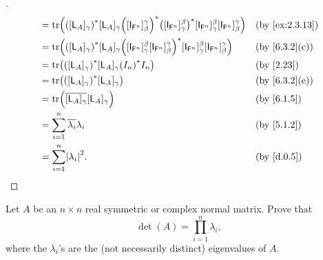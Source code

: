 \begin{proof}[]
\begin{align*}
               & = \tr[\pa{[\L_A]_{\gamma}}^* [\L_A]_{\gamma} \pa{[\IT[\vs{F}^n]]_{\beta}^{\gamma}}^* \pa{[\IT[\vs{F}^n]]_{\gamma}^{\beta}}^* [\IT[\vs{F}^n]]_{\gamma}^{\beta} [\IT[\vs{F}^n]]_{\beta}^{\gamma}] &  & \by{ex:2.3.13} \\
               & = \tr[\pa{[\L_A]_{\gamma}}^* [\L_A]_{\gamma} \pa{[\IT[\vs{F}^n]]_{\gamma}^{\beta} [\IT[\vs{F}^n]]_{\beta}^{\gamma}}^* [\IT[\vs{F}^n]]_{\gamma}^{\beta} [\IT[\vs{F}^n]]_{\beta}^{\gamma}]        &  & \by{6.3.2}[c]  \\
               & = \tr[\pa{[\L_A]_{\gamma}}^* [\L_A]_{\gamma} \pa{I_n}^* I_n]                                                                                                                                    &  & \by{2.23}      \\
               & = \tr[\pa{[\L_A]_{\gamma}}^* [\L_A]_{\gamma}]                                                                                                                                                   &  & \by{6.3.2}[e]  \\
               & = \tr[\conj{[\L_A]_{\gamma}} [\L_A]_{\gamma}]                                                                                                                                                   &  & \by{6.1.5}     \\
               & = \sum_{i = 1}^n \conj{\lambda_i} \lambda_i                                                                                                                                                     &  & \by{5.1.2}     \\
               & = \sum_{i = 1}^n \abs{\lambda_i}^2.                                                                                                                                                             &  & \by{d.0.5}
  \end{align*}
\end{proof}

\setcounter{ex}{11}
\begin{ex}\label{ex:6.5.12}
  Let \(A\) be an \(n \times n\) real symmetric or complex normal matrix.
  Prove that
  \[
    \det(A) = \prod_{i = 1}^n \lambda_i,
  \]
  where the \(\lambda_i\)'s are the (not necessarily distinct) eigenvalues of \(A\).
\end{ex}

